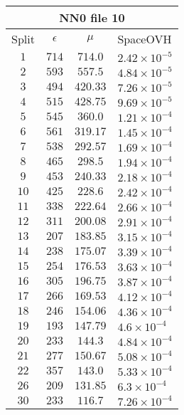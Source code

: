 \documentclass[]{article}
\begin{document}
	\begin{table}

	
	\begin{tabular}{|c | c | c | l |}
		
		\multicolumn{4}{c}{NN0 file 10} \\
		\hline
		Split & $\epsilon$ & $\mu$ & SpaceOVH \\ \hline
		$1$ & $714$ & $714.0$ & $2.42\times 10^{-5}$ \\ 
		$2$ & $593$ & $557.5$ & $4.84\times 10^{-5}$ \\ 
		$3$ & $494$ & $420.33$ & $7.26\times 10^{-5}$ \\ 
		$4$ & $515$ & $428.75$ & $9.69\times 10^{-5}$ \\ 
		$5$ & $545$ & $360.0$ & $1.21\times 10^{-4}$ \\ 
		$6$ & $561$ & $319.17$ & $1.45\times 10^{-4}$ \\ 
		$7$ & $538$ & $292.57$ & $1.69\times 10^{-4}$ \\ 
		$8$ & $465$ & $298.5$ & $1.94\times 10^{-4}$ \\ 
		$9$ & $453$ & $240.33$ & $2.18\times 10^{-4}$ \\ 
		$10$ & $425$ & $228.6$ & $2.42\times 10^{-4}$ \\ 
		$11$ & $338$ & $222.64$ & $2.66\times 10^{-4}$ \\ 
		$12$ & $311$ & $200.08$ & $2.91\times 10^{-4}$ \\ 
		$13$ & $207$ & $183.85$ & $3.15\times 10^{-4}$ \\ 
		$14$ & $238$ & $175.07$ & $3.39\times 10^{-4}$ \\ 
		$15$ & $254$ & $176.53$ & $3.63\times 10^{-4}$ \\ 
		$16$ & $305$ & $196.75$ & $3.87\times 10^{-4}$ \\ 
		$17$ & $266$ & $169.53$ & $4.12\times 10^{-4}$ \\ 
		$18$ & $246$ & $154.06$ & $4.36\times 10^{-4}$ \\ 
		$19$ & $193$ & $147.79$ & $4.6\times 10^{-4}$ \\ 
		$20$ & $233$ & $144.3$ & $4.84\times 10^{-4}$ \\ 
		$21$ & $277$ & $150.67$ & $5.08\times 10^{-4}$ \\ 
		$22$ & $357$ & $143.0$ & $5.33\times 10^{-4}$ \\ 
		$26$ & $209$ & $131.85$ & $6.3\times 10^{-4}$ \\ 
		$30$ & $233$ & $116.7$ & $7.26\times 10^{-4}$ \\ 

\end{tabular}
\end{table}
\end{document}
